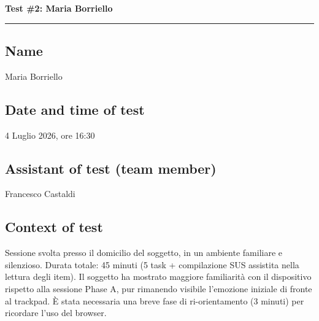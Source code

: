 ﻿\documentclass[11pt,a4paper]{article}
\begin{document}

\newpage
\begin{center}
  {\color{primaryColor}\large\bfseries Test \#2: Maria Borriello}\\
  \vspace{0.1cm}
  \color{borderColor}\hrule
\end{center}

\vspace{0.5cm}

\subsection*{Name}
\begin{tcolorbox}[base]
Maria Borriello
\end{tcolorbox}

\subsection*{Date and time of test}
\begin{tcolorbox}[base]
4 Luglio 2026, ore 16:30
\end{tcolorbox}

\subsection*{Assistant of test (team member)}
\begin{tcolorbox}[base]
Francesco Castaldi
\end{tcolorbox}

\subsection*{Context of test}
\begin{tcolorbox}[base]
Sessione svolta presso il domicilio del soggetto, in un
ambiente familiare e silenzioso. Durata totale: 45 minuti
(5 task + compilazione SUS assistita nella lettura degli item).
Il soggetto ha mostrato maggiore familiarità con il dispositivo
rispetto alla sessione Phase A, pur rimanendo visibile l'emozione
iniziale di fronte al trackpad. È stata necessaria una breve fase
di ri-orientamento (3 minuti) per ricordare l'uso del browser.
\end{tcolorbox}
\end{document}
